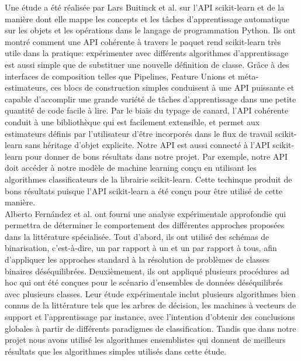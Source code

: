 \documentclass[12pt, french]{report}
\begin{document}
Une étude a été réalisée par Lars Buitinck et al. \cite{key36} sur l'API scikit-learn et de la manière dont elle mappe les concepts et les tâches d'apprentissage automatique sur les objets et les opérations dans le langage de programmation Python. Ils ont montré comment une API cohérente à travers le paquet rend scikit-learn très utile dans la pratique: expérimenter avec différents algorithmes d'apprentissage est aussi simple que de substituer une nouvelle définition de classe. Grâce à des interfaces de composition telles que Pipelines, Feature Unions et méta-estimateurs, ces blocs de construction simples conduisent à une API puissante et capable d'accomplir une grande variété de tâches d'apprentissage dans une petite quantité de code facile à lire. Par le biais du typage de canard, l'API cohérente conduit à une bibliothèque qui est facilement extensible, et permet aux estimateurs définis par l'utilisateur d'être incorporés dans le flux de travail scikit-learn sans héritage d'objet explicite. Notre API est aussi connecté à l'API  scikit-learn pour donner de bons résultats dans notre projet. Par exemple, notre API doit accéder à notre modèle de machine learning conçu en utilisant les algorithmes classificateurs de la librairie  scikit-learn. Cette techinque produit de bons résultats puisque l'API  scikit-learn a été conçu pour être utilisé de cette manière.\\

Alberto Fernández et al. \cite{key30} ont fourni une analyse expérimentale approfondie qui permettra de déterminer le comportement des différentes approches proposées dans la littérature spécialisée. Tout d'abord, ils ont utilisé des schémas de binarisation, c'est-à-dire, un par rapport à un et un par rapport à tous, afin d'appliquer les approches standard à la résolution de problèmes de classes binaires déséquilibrées. Deuxièmement, ils ont appliqué plusieurs procédures ad hoc qui ont été conçues pour le scénario d'ensembles de données déséquilibrés avec plusieurs classes. Leur étude expérimentale inclut plusieurs algorithmes bien connus de la littérature tels que les arbres de décision, les machines à vecteurs de support et l'apprentissage par instance, avec l'intention d'obtenir des conclusions globales à partir de différents paradigmes de classification. Tandis que dans notre projet nous avons utilisé les algorithmes ensemblistes qui donnent de meilleurs résultats que les algorithmes simples utilisés dans cette étude.\\
\end{document}
